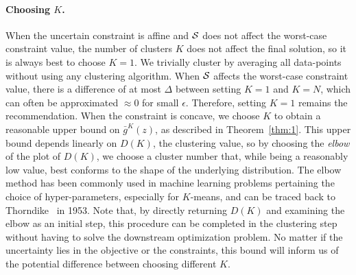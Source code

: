 {\paragraph{Choosing $K$.}
When the uncertain constraint is affine and $\mathcal{S}$ does not affect the worst-case constraint value, the number of clusters $K$ does not affect the final solution, so it is always best to choose $K = 1$.
We trivially cluster by averaging all data-points without using any clustering algorithm.
When $\mathcal{S}$ affects the worst-case constraint value, there is a difference of at most $\Delta$ between setting $K=1$ and $K=N$, which can often be approximated $\approx 0$ for small $\epsilon$. Therefore, setting $K = 1$ remains the recommendation.
When the constraint is concave, we choose $K$ to obtain a reasonable upper bound on $\bar{g}^K(z)$, as described in Theorem~\ref{thm:1}.
This upper bound depends linearly on $D(K)$, the clustering value, so by choosing the {\it elbow} of the plot of $D(K)$, we choose a cluster number that, while being a reasonably low value, best conforms to the shape of the underlying distribution.
The elbow method has been commonly used in machine learning problems pertaining the choice of hyper-parameters, especially for $K$-means, and can be traced back to Thorndike~\cite{elbow} in 1953.
Note that, by directly returning $D(K)$ and examining the elbow as an initial step, this procedure can be completed in the clustering step without having to solve the downstream optimization problem.
No matter if the uncertainty lies in the objective or the constraints, this bound will inform us of the potential difference between choosing different $K$.

}
